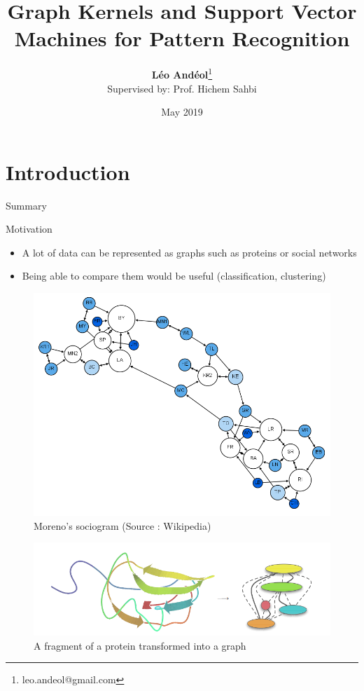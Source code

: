 \documentclass[compress]{beamer}
\title[Graph Kernels]{Graph Kernels and Support Vector Machines for Pattern Recognition}
\author[Léo Andéol]{\textbf{Léo Andéol}\thanks{leo.andeol@gmail.com}\\ \footnotesize Supervised by: Prof. Hichem Sahbi}
\institute[Sorbonne Uni.]{Master DAC - Sorbonne Université}
\date{May 2019}
\begin{document}
\begin{frame}
  \titlepage
\end{frame}

\section{Introduction}
\begin{frame}{Summary}
  \tableofcontents[currentsection]
\end{frame}
\begin{frame}{Motivation}
\begin{multicols}{2}
	\begin{itemize}
		\item A lot of data can be represented as graphs such as proteins or social networks
		\item Being able to compare them would be useful (classification, clustering)
	\end{itemize}
	\begin{figure}
		\includegraphics[height=.3\textheight]{data/sociogram.png}\par
		\caption{\footnotesize Moreno's sociogram (Source : Wikipedia)}
	\end{figure}
\end{multicols}

\begin{figure}
	\centering
	\includegraphics[height=.15\textheight, width=\linewidth]{data/ecoli.png}
\caption{A fragment of a protein transformed into a graph\cite{vishwanathan_graph_2010}}
\end{figure}

\end{frame}
\end{document}
